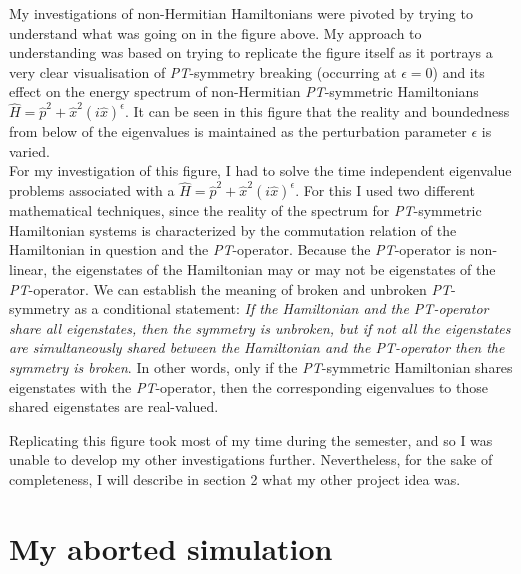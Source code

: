 \documentclass[10pt, a4paper, singlespacing, headsepline]{article}
\newcommand\PT{\textit{PT}}
\begin{document}
My investigations of non-Hermitian Hamiltonians were pivoted by trying to understand what was going on in the figure above. My approach to understanding was based on trying to replicate the figure itself as it portrays a very clear visualisation of \PT-symmetry breaking (occurring at $\epsilon = 0$) and its effect on the energy spectrum of non-Hermitian \PT-symmetric Hamiltonians $\hat{H} = \hat{p}^2 + \hat{x}^2 (i \hat{x})^{\epsilon}$. It can be seen in this figure that the reality and boundedness from below of the eigenvalues is maintained as the perturbation parameter $\epsilon$ is varied.\\

For my investigation of this figure, I had to solve the time independent eigenvalue problems associated with a $\hat{H} = \hat{p}^2 + \hat{x}^2 (i \hat{x})^{\epsilon}$. For this I used two different mathematical techniques, since the reality of the spectrum for \PT-symmetric Hamiltonian systems is characterized by the commutation relation of the Hamiltonian in question and the \PT-operator. Because the \PT-operator is non-linear, the eigenstates of the Hamiltonian may or may not be eigenstates of the \PT-operator. We can establish the meaning of broken and unbroken \PT-symmetry as a conditional statement: \textit{If the Hamiltonian and the \PT-operator share all eigenstates, then the symmetry is unbroken, but if not all the eigenstates are simultaneously shared between the Hamiltonian and the \PT-operator then the symmetry is broken}\cite{BenderPT}\cite{Bender}. In other words, only if the \PT-symmetric Hamiltonian shares eigenstates with the \PT-operator, then the corresponding eigenvalues to those shared eigenstates are real-valued.

Replicating this figure took most of my time during the semester, and so I was unable to develop my other investigations further. Nevertheless, for the sake of completeness, I will describe in section 2 what my other project idea was.

\section{My aborted simulation}
\end{document}
